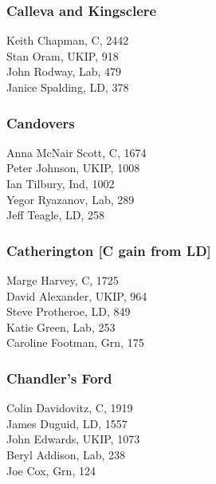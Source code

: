 \documentclass[a4paper,openany,10pt]{book}
\begin{document}
\subsubsection*{Calleva and Kingsclere}



Keith Chapman, C, 2442\\
Stan Oram, UKIP, 918\\
John Rodway, Lab, 479\\
Janice Spalding, LD, 378\\


\subsubsection*{Candovers}



Anna McNair Scott, C, 1674\\
Peter Johnson, UKIP, 1008\\
Ian Tilbury, Ind, 1002\\
Yegor Ryazanov, Lab, 289\\
Jeff Teagle, LD, 258\\


\subsubsection*{Catherington \hspace*{\fill}\nolinebreak[1]%
\enspace\hspace*{\fill}
[C gain from LD]}



Marge Harvey, C, 1725\\
David Alexander, UKIP, 964\\
Steve Protheroe, LD, 849\\
Katie Green, Lab, 253\\
Caroline Footman, Grn, 175\\


\subsubsection*{Chandler's Ford}



Colin Davidovitz, C, 1919\\
James Duguid, LD, 1557\\
John Edwards, UKIP, 1073\\
Beryl Addison, Lab, 238\\
Joe Cox, Grn, 124\\
\end{document}
